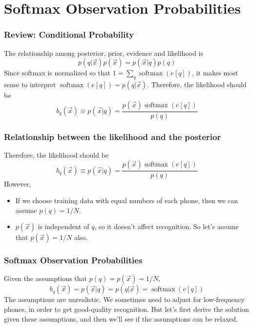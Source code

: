 \documentclass{beamer}
\DeclareMathOperator*{\softmax}{softmax}
\begin{document}
\section[Softmax]{Softmax Observation Probabilities}
\setcounter{subsection}{1}

\begin{frame}
  \frametitle{Review: Conditional Probability}

  The relationship among posterior, prior, evidence and likelihood is
  \begin{displaymath}
    p(q|\vec{x})p(\vec{x})=p(\vec{x}|q)p(q)
  \end{displaymath}
  Since softmax is normalized so that $1=\sum_q \softmax(e[q])$, it
  makes most sense to interpret $\softmax(e[q])=p(q|\vec{x})$.
  Therefore, the likelihood should be
  \begin{displaymath}
    b_q(\vec{x}) \equiv p(\vec{x}|q) = \frac{p(\vec{x})\softmax(e[q])}{p(q)}
  \end{displaymath}
\end{frame}
  
\begin{frame}
  \frametitle{Relationship between the likelihood and the posterior}
  
  Therefore, the likelihood should be
  \begin{displaymath}
    b_q(\vec{x}) \equiv p(\vec{x}|q) = \frac{p(\vec{x})\softmax(e[q])}{p(q)}
  \end{displaymath}
  However,
  \begin{itemize}
  \item If we choose training data with equal numbers of each phone, then
    we can assume $p(q)=1/N$.
  \item $p(\vec{x})$ is independent of $q$, so it doesn't affect
    recognition.  So let's assume that  $p(\vec{x})=1/N$ also.
  \end{itemize}
\end{frame}
  
\begin{frame}
  \frametitle{Softmax Observation Probabilities}

  Given the assumptions that $p(q)=p(\vec{x})=1/N$, 
  \begin{displaymath}
    b_q(\vec{x}) = p(\vec{x}|q)=p(q|\vec{x}) = \softmax(e[q])
  \end{displaymath}
  The assumptions are unrealistic.  We sometimes need to adjust for
  low-frequency phones, in order to get good-quality recognition.  But
  let's first derive the solution given these assumptions, and then
  we'll see if the assumptions can be relaxed.
\end{frame}
\end{document}
